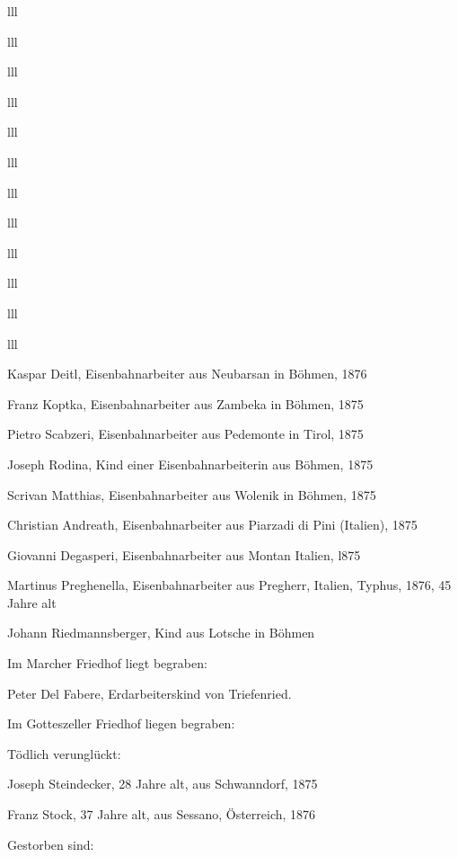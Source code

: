 \documentclass[12pt,a4pager]{book}
\begin{document}
\begin{tabuluar}{lll}
\begin{tabuluar}{lll}
\begin{tabuluar}{lll}
\begin{tabuluar}{lll}
\begin{tabuluar}{lll}
\begin{tabuluar}{lll}
\begin{tabuluar}{lll}
\begin{tabuluar}{lll}
\begin{tabuluar}{lll}
\begin{tabuluar}{lll}
\begin{tabuluar}{lll}
\begin{tabuluar}{lll}
\begin{compactitem}
\item Kaspar Deitl, Eisenbahnarbeiter aus Neubarsan in Böhmen, 1876
\item Franz Koptka, Eisenbahnarbeiter aus Zambeka in Böhmen, 1875
\item Pietro Scabzeri, Eisenbahnarbeiter aus Pedemonte in Tirol, 1875
\item Joseph Rodina, Kind einer Eisenbahnarbeiterin aus Böhmen, 1875
\item Scrivan Matthias, Eisenbahnarbeiter aus Wolenik in Böhmen, 1875
\item Christian Andreath, Eisenbahnarbeiter aus Piarzadi di Pini (Italien), 1875
\item Giovanni Degasperi, Eisenbahnarbeiter aus Montan Italien, l875
\item Martinus Preghenella, Eisenbahnarbeiter aus Pregherr, Italien, Typhus,
1876, 45 Jahre alt
\item Johann Riedmannsberger, Kind aus Lotsche in Böhmen
\end{compactitem}

Im Marcher Friedhof liegt begraben:

\begin{compactitem}
\item Peter Del Fabere, Erdarbeiterskind von Triefenried.
\end{compactitem}

Im Gotteszeller Friedhof liegen begraben:

Tödlich verunglückt:

\begin{compactitem}
\item Joseph Steindecker, 28 Jahre alt, aus Schwanndorf, 1875
\item Franz Stock, 37 Jahre alt, aus Sessano, Österreich, 1876
\end{compactitem}

Gestorben sind:


\end{tabuluar}
\end{tabuluar}
\end{tabuluar}
\end{tabuluar}
\end{tabuluar}
\end{tabuluar}
\end{tabuluar}
\end{tabuluar}
\end{tabuluar}
\end{tabuluar}
\end{tabuluar}
\end{tabuluar}
\end{document}
